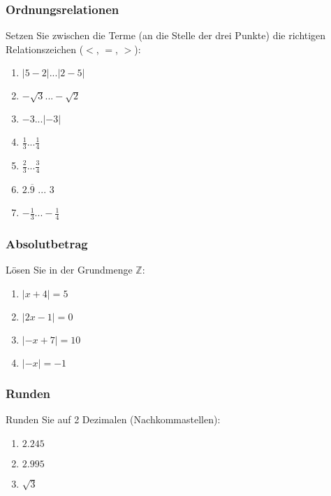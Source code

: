 \subsubsection{Ordnungsrelationen}
Setzen Sie zwischen die Terme (an die Stelle der drei Punkte) die
richtigen Relationszeichen ($<$, $=$, $>$):

\begin{multicols}{2}
\begin{enumerate}[label=\alph*)]
 \item$|5-2| ... |2-5|$ \TRAINER{$=$}
 \item$-\sqrt{3} ... -\sqrt{2}$ \TRAINER{$<$}
 \item$-3 ... |-3|$ \TRAINER{$<$}
 \item$\frac{1}{3} ... \frac{1}{4}$ \TRAINER{$>$}
 \item$\frac{2}{3} ... \frac{3}{4}$ \TRAINER{$<$}
 \item$2.\overline{9}$ ... 3\TRAINER{$=$}
 \item$-\frac{1}{3} ... -\frac{1}{4}$ \TRAINER{$<$}
\end{enumerate}
\end{multicols}


\subsubsection{Absolutbetrag}
Lösen Sie in der Grundmenge $\mathbb{Z}$:

\begin{multicols}{2}
\begin{enumerate}[label=\alph*)]
 \item$|x+4| = 5$ 
 \item$|2x-1| = 0$ 
 \item$|-x + 7| = 10$ 
 \item$|-x|=-1$ 
\end{enumerate}
\end{multicols}

\subsubsection{Runden}
Runden Sie auf 2 Dezimalen (Nachkommastellen):

\begin{multicols}{3}
\begin{enumerate}[label=\alph*)]
 \item$2.245$ 
 \item$2.995$ 
 \item$\sqrt{3}$ 
\end{enumerate}
\end{multicols}

